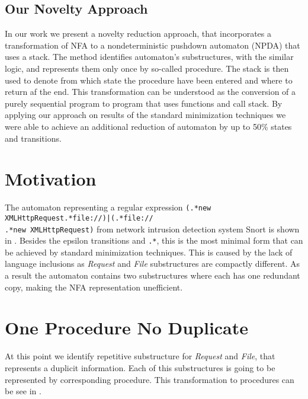 \documentclass{ExcelAtFIT}
\begin{document}
	\subsection*{Our Novelty Approach}
		In our work we present a novelty reduction approach, that incorporates a transformation of NFA to a nondeterministic pushdown automaton (NPDA) that uses a stack. The method identifies automaton's substructures, with the similar logic, and represents them only once by so-called procedure. The stack is then used to denote from which state the procedure have been entered and where to return af the end. This transformation can be understood as the conversion of a purely sequential program to program that uses functions and call stack. By applying our approach on results of the standard minimization techniques we were able to achieve an additional reduction of automaton by up to 50\% states and transitions.

\section{Motivation}
	The automaton representing a regular expression \texttt{(.*new XMLHttpRequest.*file://)|(.*file://\\.*new XMLHttpRequest)} from network intrusion detection system Snort \cite{Snort} is shown in . Besides the epsilon transitions and \texttt{.*}, this is the most minimal form that can be achieved by standard minimization techniques. This is caused by the lack of language inclusions as  \textit{Request} and \textit{File} substructures are compactly different. As a result the automaton contains two substructures where each has one redundant copy, making the NFA representation unefficient.

\section{One Procedure No Duplicate}
	At this point we identify repetitive substructure for \textit{Request} and \textit{File}, that represents a duplicit information. Each of this substructures is going to be represented by corresponding procedure. This transformation to procedures can be see in .
\end{document}
